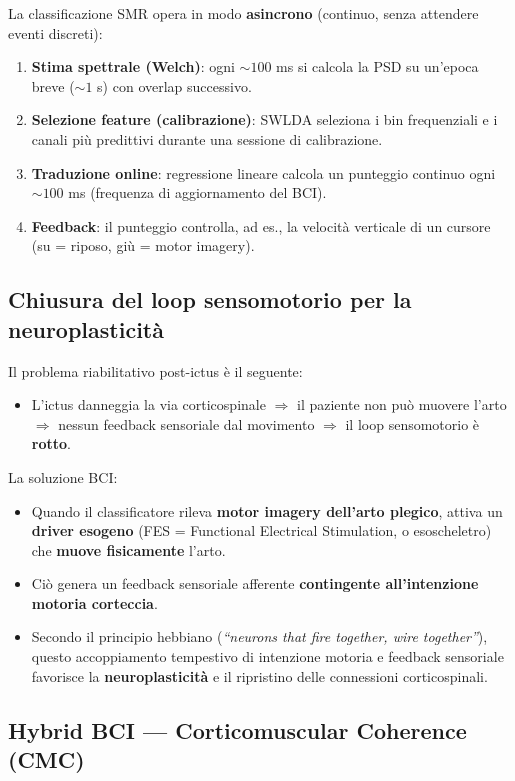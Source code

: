 La classificazione SMR opera in modo \textbf{asincrono} (continuo, senza attendere eventi discreti):
\begin{enumerate}
    \item \textbf{Stima spettrale (Welch)}: ogni $\sim 100$ ms si calcola la PSD su un'epoca breve ($\sim 1$ s) con overlap successivo.
    \item \textbf{Selezione feature (calibrazione)}: SWLDA seleziona i bin frequenziali e i canali più predittivi durante una sessione di calibrazione.
    \item \textbf{Traduzione online}: regressione lineare calcola un punteggio continuo ogni $\sim 100$ ms (frequenza di aggiornamento del BCI).
    \item \textbf{Feedback}: il punteggio controlla, ad es., la velocità verticale di un cursore (su = riposo, giù = motor imagery).
\end{enumerate}

\subsection{Chiusura del loop sensomotorio per la neuroplasticità}

Il problema riabilitativo post-ictus è il seguente:
\begin{itemize}
    \item L'ictus danneggia la via corticospinale $\Rightarrow$ il paziente non può muovere l'arto $\Rightarrow$ nessun feedback sensoriale dal movimento $\Rightarrow$ il loop sensomotorio è \textbf{rotto}.
\end{itemize}

La soluzione BCI:
\begin{itemize}
    \item Quando il classificatore rileva \textbf{motor imagery dell'arto plegico}, attiva un \textbf{driver esogeno} (FES = Functional Electrical Stimulation, o esoscheletro) che \textbf{muove fisicamente} l'arto.
    \item Ciò genera un feedback sensoriale afferente \textbf{contingente all'intenzione motoria corteccia}.
    \item Secondo il principio hebbiano (\textit{``neurons that fire together, wire together''}), questo accoppiamento tempestivo di intenzione motoria e feedback sensoriale favorisce la \textbf{neuroplasticità} e il ripristino delle connessioni corticospinali.
\end{itemize}

\subsection{Hybrid BCI — Corticomuscular Coherence (CMC)}

